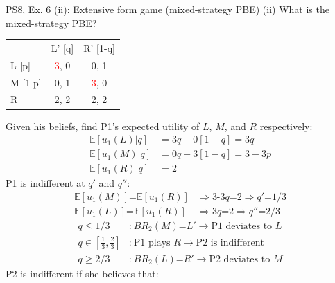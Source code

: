 \begin{frame}{PS8, Ex. 6 (ii): Extensive form game (mixed-strategy PBE)}
    (ii) What is the mixed-strategy PBE? \vspace{-8pt}
    \begin{multicols}{2}
      \begin{table}
        \begin{tabular}{l|c|c|}
          \multicolumn{1}{c}{} & \multicolumn{1}{c}{L' [q]} & \multicolumn{1}{c}{R' [1-q]} \\\cline{2-3}
          L [p]   & \textcolor{red}{3}, 0 & 0, \color{blue}1 \\\cline{2-3}
          M [1-p] & 0, \color{blue}1 & \textcolor{red}{3}, 0 \\\cline{2-3}
          R       & 2, \color{blue}2 & 2, \color{blue}2 \\\cline{2-3}
        \end{tabular}
      \end{table} \vspace{-4pt}
      Given his beliefs, find P1's expected utility of $L$, $M$, and $R$ respectively: \vspace{-4pt}
      \begin{align*}
        \mathbb{E}[u_1(L)|q]&=3q+0[1-q]=3q\\
        \mathbb{E}[u_1(M)|q]&=0q+3[1-q]=3-3p\\
        \mathbb{E}[u_1(R)|q]&=2
      \end{align*}
      P1 is indifferent at $q'$ and $q''$: \vspace{-6pt}
      \begin{align*}
        \mathbb{E}[u_1(M)]\text{=}\mathbb{E}[u_1(R)]&\Rightarrow \text{3-3}q\text{=}2\Rightarrow q'\text{=}1/3\\
        \mathbb{E}[u_1(L)]\text{=}\mathbb{E}[u_1(R)]&\Rightarrow 3q\text{=}2\Rightarrow q''\text{=}2/3
      \end{align*} \vspace{-16pt}
      \begin{align*}
        q\leq1/3&\text{:}\ BR_2(M)\text{=}L'\rightarrow\text{P1 deviates to }L\\
        q\text{$\in$}{\textstyle\left[\frac{1}{3},\frac{2}{3}\right]}&\text{:}\ \text{P1 plays }R\rightarrow\text{P2 is indifferent}\\
        q\geq2/3&\text{:}\ BR_2(L)\text{=}R'\rightarrow\text{P2 deviates to }M
      \end{align*}
      P2 is indifferent if she believes that: \vspace{-6pt}

\end{multicols}
\end{frame}
